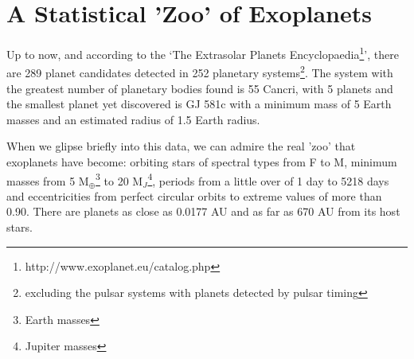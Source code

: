 \documentclass[dvips,12pt,a4paper]{report}
\begin{document}



\section {A Statistical 'Zoo' of Exoplanets}

\indent Up to now, and according to the `The Extrasolar Planets Encyclopaedia\footnote{http://www.exoplanet.eu/catalog.php}', there are 289 planet candidates detected in 252 planetary systems\footnote{excluding the pulsar systems with planets detected by pulsar timing}. The system with the greatest number of planetary bodies found is 55 Cancri, with 5 planets \citep{Fischer-2008} and the smallest planet yet discovered is GJ 581c \citep{Udry-2007b} with a minimum mass of 5 Earth masses and an estimated radius of 1.5 Earth radius. 

When we glipse briefly into this data, we can admire the real 'zoo' that exoplanets have become: orbiting stars of spectral types from F to M, minimum masses from 5 M$_{\oplus}$\footnote{Earth masses} to 20 M$_J$\footnote{Jupiter masses}, periods from a little over of 1 day to 5218 days and eccentricities from perfect circular orbits to extreme values of more than 0.90. There are planets as close as 0.0177 AU and as far as 670 AU from its host stars.
\end{document}
